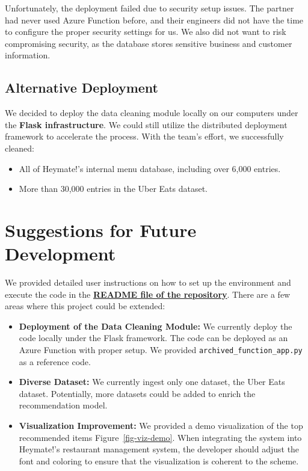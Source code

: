\documentclass[
  11pt,
  a4paper,
  DIV=11,
  numbers=noendperiod]{scrartcl}
\providecommand{\tightlist}{%
  \setlength{\itemsep}{0pt}\setlength{\parskip}{0pt}}\usepackage{longtable,booktabs,array}
\begin{document}
Unfortunately, the deployment failed due to security setup issues. The
partner had never used Azure Function before, and their engineers did
not have the time to configure the proper security settings for us. We
also did not want to risk compromising security, as the database stores
sensitive business and customer information.

\subsection{Alternative Deployment}\label{alternative-deployment}

We decided to deploy the data cleaning module locally on our computers
under the \textbf{Flask infrastructure}. We could still utilize the
distributed deployment framework to accelerate the process. With the
team's effort, we successfully cleaned:

\begin{itemize}
\tightlist
\item
  All of Heymate!'s internal menu database, including over 6,000
  entries.
\item
  More than 30,000 entries in the Uber Eats dataset.
\end{itemize}

\section{Suggestions for Future
Development}\label{suggestions-for-future-development}

We provided detailed user instructions on how to set up the environment
and execute the code in the
\textbf{\href{https://github.com/UBC-MDS/heymate-report}{README file of
the repository}}. There are a few areas where this project could be
extended:

\begin{itemize}
\tightlist
\item
  \textbf{Deployment of the Data Cleaning Module:} We currently deploy
  the code locally under the Flask framework. The code can be deployed
  as an Azure Function with proper setup. We provided
  \texttt{archived\_function\_app.py} as a reference code.
\item
  \textbf{Diverse Dataset:} We currently ingest only one dataset, the
  Uber Eats dataset. Potentially, more datasets could be added to enrich
  the recommendation model.
\item
  \textbf{Visualization Improvement:} We provided a demo visualization
  of the top recommended items Figure~\ref{fig-viz-demo}. When
  integrating the system into Heymate!'s restaurant management system,
  the developer should adjust the font and coloring to ensure that the
  visualization is coherent to the scheme.
\end{itemize}
\end{document}
